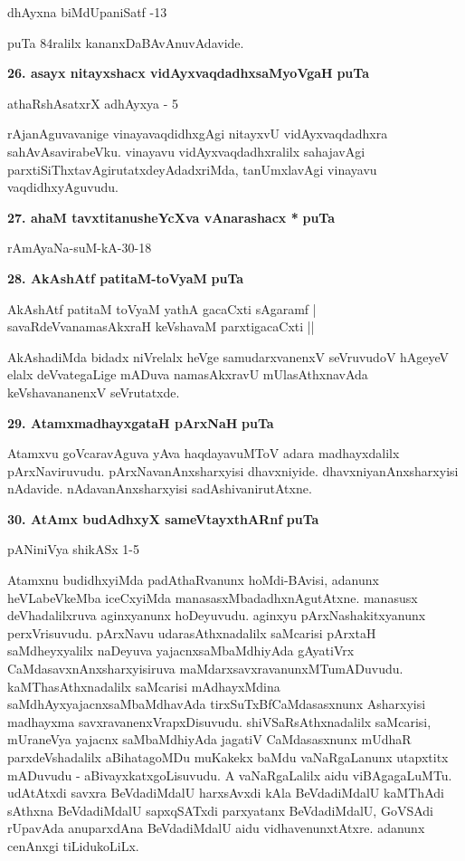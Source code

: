 \hfill{dhAyxna biMdUpaniSatf -13}

puTa 84ralilx kananxDaBAvAnuvAdavide.

\eject

\noindent
\textbf{26. asayx nitayxshacx vidAyxvaqdadhxsaMyoVgaH} \hfill{\bf puTa }

\hfill{athaRshAsatxrX adhAyxya - 5}

\smallskip
rAjanAguvavanige vinayavaqdidhxgAgi nitayxvU vidAyxvaqdadhxra sahAvAsavirabeVku. vinayavu vidAyxvaqdadhxralilx sahajavAgi parxtiSiThxtavAgirutatxdeyAdadxriMda, tanUmxlavAgi vinayavu vaqdidhxyAguvudu.

\medskip
\noindent
\textbf{27. ahaM tavxtitanusheYcXva vAnarashacx *} \hfill{\bf puTa }

\hfill{rAmAyaNa-suM-kA-30-18}

\medskip
\noindent
\textbf{28. AkAshAtf patitaM-toVyaM} \hfill{\bf puTa }

\begin{shloka}
AkAshAtf patitaM toVyaM yathA gacaCxti sAgaramf |\\
savaRdeVvanamasAkxraH keVshavaM parxtigacaCxti ||
\end{shloka}

AkAshadiMda bidadx niVrelalx heVge samudarxvanenxV seVruvudoV hAgeyeV elalx deVvategaLige mADuva namasAkxravU mUlasAthxnavAda keVshavananenxV seVrutatxde.

\smallskip
\noindent
\textbf{29. AtamxmadhayxgataH pArxNaH} \hfill{\bf puTa }

Atamxvu goVcaravAguva yAva haqdayavuMToV adara madhayxdalilx pArxNaviruvudu. pArxNavanAnxsharxyisi dhavxniyide. dhavxniyanAnxsharxyisi nAdavide. nAdavanAnxsharxyisi sadAshivanirutAtxne. 

\medskip
\noindent
\textbf{30. AtAmx budAdhxyX sameVtayxthARnf} \hfill{\bf puTa }

\hfill{pANiniVya shikASx 1-5}

\smallskip
Atamxnu budidhxyiMda padAthaRvanunx hoMdi-BAvisi, adanunx heVLabeVkeMba iceCxyiMda manasasxMbadadhxnAgutAtxne. manasusx deVhadalilxruva aginxyanunx hoDeyuvudu. aginxyu pArxNashakitxyanunx perxVrisuvudu. pArxNavu udarasAthxnadalilx saMcarisi pArxtaH saMdheyxyalilx naDeyuva yajacnxsaMbaMdhiyAda gAyatiVrx CaMdasavxnAnxsharxyisiruva maMdarxsavxravanunxMTumADuvudu. kaMThasAthxnadalilx saMcarisi mAdhayxMdina saMdhAyxyajacnxsaMbaMdhavAda tirxSuTxBfCaMdasasxnunx Asharxyisi madhayxma savxravanenxVrapxDisuvudu. shiVSaRsAthxnadalilx saMcarisi, mUraneVya yajacnx saMbaMdhiyAda jagatiV CaMdasasxnunx mUdhaR parxdeVshadalilx aBihatagoMDu muKakekx baMdu vaNaRgaLanunx utapxtitx mADuvudu - aBivayxkatxgoLisuvudu. A vaNaRgaLalilx aidu viBAgagaLuMTu. udAtAtxdi savxra BeVdadiMdalU harxsAvxdi kAla BeVdadiMdalU kaMThAdi sAthxna BeVdadiMdalU sapxqSATxdi parxyatanx BeVdadiMdalU, GoVSAdi rUpavAda anuparxdAna BeVdadiMdalU aidu vidhavenunxtAtxre. adanunx cenAnxgi tiLidukoLiLx.

